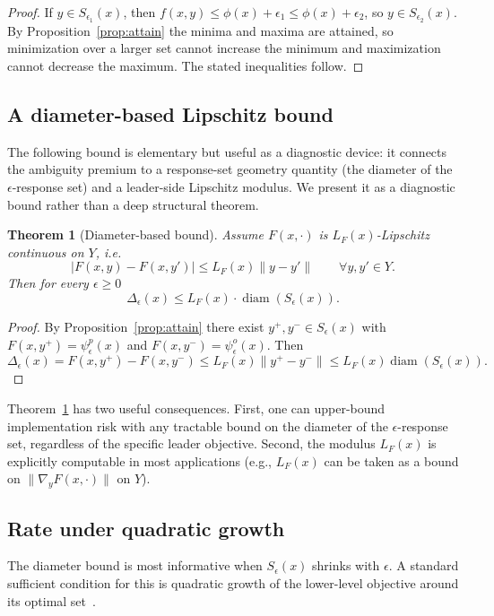 \documentclass[11pt]{article}
\newtheorem{theorem}{Theorem}[section]
\theoremstyle{definition}
\newcommand{\eps}{\epsilon}
\DeclareMathOperator{\diam}{diam}
\begin{document}
\begin{proof}
If $y\in S_{\eps_1}(x)$, then $f(x,y)\le\phi(x)+\eps_1\le\phi(x)+\eps_2$,
so $y\in S_{\eps_2}(x)$. By Proposition~\ref{prop:attain} the
minima and maxima are attained, so minimization over a larger set
cannot increase the minimum and maximization cannot decrease the
maximum. The stated inequalities follow.
\end{proof}

\subsection{A diameter-based Lipschitz bound}
The following bound is elementary but useful as a diagnostic
device: it connects the ambiguity premium to a response-set
geometry quantity (the diameter of the $\eps$-response set) and a
leader-side Lipschitz modulus. We present it as a diagnostic
bound rather than a deep structural theorem.

\begin{theorem}[Diameter-based bound]\label{thm:diam-bound}
Assume $F(x,\cdot)$ is $L_F(x)$-Lipschitz continuous on $Y$, i.e.
\begin{equation}\label{eq:LF}
  |F(x,y)-F(x,y')|\le L_F(x)\|y-y'\|
  \qquad\forall y,y'\in Y.
\end{equation}
Then for every $\eps\ge 0$
\begin{equation}\label{eq:diam-bound}
  \Delta_\eps(x)\le L_F(x)\cdot\diam(S_\eps(x)).
\end{equation}
\end{theorem}

\begin{proof}
By Proposition~\ref{prop:attain} there exist
$y^+,y^-\in S_\eps(x)$ with $F(x,y^+)=\psi_\eps^p(x)$ and
$F(x,y^-)=\psi_\eps^o(x)$. Then
\[
  \Delta_\eps(x)=F(x,y^+)-F(x,y^-)
  \le L_F(x)\|y^+-y^-\|
  \le L_F(x)\diam(S_\eps(x)).
\]
\end{proof}

Theorem~\ref{thm:diam-bound} has two useful consequences. First,
one can upper-bound implementation risk with any tractable
bound on the diameter of the $\eps$-response set, regardless of the
specific leader objective. Second, the modulus $L_F(x)$ is
explicitly computable in most applications (e.g., $L_F(x)$ can be
taken as a bound on $\|\nabla_y F(x,\cdot)\|$ on $Y$).

\subsection{Rate under quadratic growth}
The diameter bound is most informative when $S_\eps(x)$ shrinks
with $\eps$. A standard sufficient condition for this is
quadratic growth of the lower-level objective around its optimal
set~\cite{bonnans2013perturbation,drusvyatskiy2018error,fabian2010error}.
\end{document}
